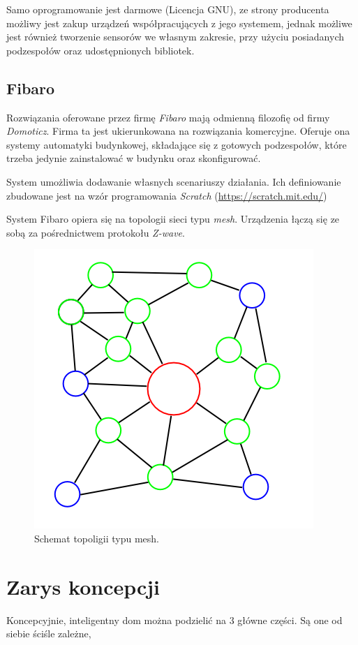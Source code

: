 \documentclass[eng,oneside]{mgr}
\begin{document}
Samo oprogramowanie jest darmowe (Licencja GNU), ze strony producenta możliwy jest zakup urządzeń współpracujących z jego systemem, jednak możliwe jest również tworzenie sensorów we własnym zakresie, przy użyciu posiadanych podzespołów oraz udostępnionych bibliotek.
\subsection{Fibaro}                                                                                              
Rozwiązania oferowane przez firmę \textit{Fibaro} mają odmienną filozofię od firmy \textit{Domoticz}. Firma ta jest ukierunkowana na rozwiązania komercyjne. Oferuje ona systemy automatyki budynkowej, składające się z gotowych podzespołów, które trzeba jedynie zainstalować w budynku oraz skonfigurować.

System umożliwia dodawanie własnych scenariuszy działania. Ich definiowanie zbudowane jest na wzór programowania \textit{Scratch} (\url{https://scratch.mit.edu/})

System Fibaro opiera się na topologii sieci typu \textit{mesh}. Urządzenia łączą się ze sobą za pośrednictwem protokołu \textit{Z-wave}.
\begin{figure}[h]
\centering
\includegraphics[width=0.7\linewidth]{mesh}
\caption{Schemat topoligii typu mesh.}
\label{fig:Mesh-Network}
\end{figure}

\section{Zarys koncepcji}
Koncepcyjnie, inteligentny dom można podzielić na 3 główne części. Są one od siebie ściśle zależne,
\end{document}
